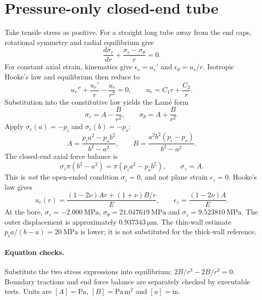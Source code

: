 \documentclass[11pt]{article}
\begin{document}
\section{Pressure-only closed-end tube}
Take tensile stress as positive. For a straight long tube away from the end caps, rotational symmetry and radial equilibrium give
\begin{equation}
\frac{d\sigma_r}{dr}+\frac{\sigma_r-\sigma_\theta}{r}=0.
\end{equation}
For constant axial strain, kinematics give $\epsilon_r=u_r'$ and $\epsilon_\theta=u_r/r$. Isotropic Hooke's law and equilibrium then reduce to
\begin{equation}
u_r''+\frac{u_r'}{r}-\frac{u_r}{r^2}=0,\qquad u_r=C_1r+\frac{C_2}{r}.
\end{equation}
Substitution into the constitutive law yields the Lam\'e form
\begin{equation}
\sigma_r=A-\frac{B}{r^2},\qquad\sigma_\theta=A+\frac{B}{r^2}.
\end{equation}
Apply $\sigma_r(a)=-p_i$ and $\sigma_r(b)=-p_o$:
\begin{equation}
A=\frac{p_i a^2-p_o b^2}{b^2-a^2},\qquad
B=\frac{a^2b^2(p_i-p_o)}{b^2-a^2}.
\end{equation}
The closed-end axial force balance is
\begin{equation}
\sigma_z\pi(b^2-a^2)=\pi(p_i a^2-p_o b^2),\qquad\sigma_z=A.
\end{equation}
This is \emph{not} the open-ended condition $\sigma_z=0$, and not plane strain $\epsilon_z=0$. Hooke's law gives
\begin{equation}
u_r(r)=\frac{(1-2\nu)Ar+(1+\nu)B/r}{E},\qquad
\epsilon_z=\frac{(1-2\nu)A}{E}.
\end{equation}
At the bore, $\sigma_r=-2.000\ \mathrm{MPa}$, $\sigma_\theta=21.047619\ \mathrm{MPa}$ and $\sigma_z=9.523810\ \mathrm{MPa}$. The outer displacement is approximately $0.937343\ \mathrm{\mu m}$. The thin-wall estimate $p_i a/(b-a)=20\ \mathrm{MPa}$ is lower; it is not substituted for the thick-wall reference.
\paragraph{Equation checks.} Substitute the two stress expressions into equilibrium: $2B/r^3-2B/r^3=0$. Boundary tractions and end force balance are separately checked by executable tests. Units are $[A]=\mathrm{Pa}$, $[B]=\mathrm{Pa\,m^2}$ and $[u]=\mathrm{m}$.
\end{document}
